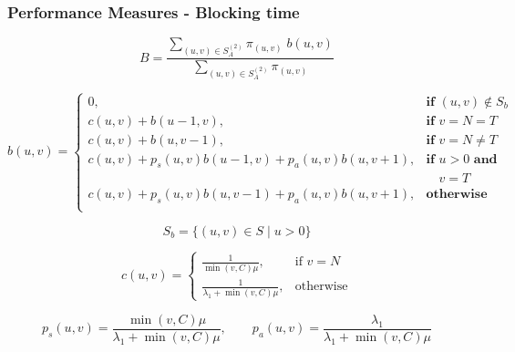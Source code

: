 \begin{frame}
    \frametitle{Performance Measures - Blocking time}

    \scriptsize
    \begin{equation*}
        B = \frac{\sum_{(u,v) \in S_A^{(2)}} \pi_{(u,v)} \; 
        b(u,v)}{\sum_{(u,v) \in S_A^{(2)}} \pi_{(u,v)}}
    \end{equation*}

    \tiny
    \pause
    \begin{equation*}
        b(u,v) = 
        \begin{cases} 
            0, & \textbf{if } (u,v) \notin S_b \\
            c(u,v) + b(u - 1, v), & \textbf{if } v = N = T\\
            c(u,v) + b(u, v-1), & \textbf{if } v = N \neq T \\
            c(u,v) + p_s(u,v) b(u-1, v) + p_a(u,v) b(u, v+1), & \textbf{if } u > 0 
            \textbf{ and } \\ 
            & \quad v = T \\
            c(u,v) + p_s(u,v) b(u, v-1) + p_a(u,v) b(u, v+1), & \textbf{otherwise} \\
        \end{cases}
    \end{equation*}
    
    \begin{equation*}
        S_b = \{(u,v) \in S \; | \; u > 0\}
    \end{equation*}
        
    \begin{equation*}
        c(u,v) = 
        \begin{cases}
            \frac{1}{\min(v,C) \mu}, & \text{if } v = N\\
            \frac{1}{\lambda_1 + \min(v,C) \mu}, & \text{otherwise}
        \end{cases}
    \end{equation*}
    
    \begin{equation*}
        p_s(u,v) = \frac{\min(v,C)\mu}{\lambda_1 + \min(v,C)\mu}, \qquad
        p_a(u,v) = \frac{\lambda_1}{\lambda_1 + \min(v,C)\mu}
    \end{equation*}
    
\end{frame}


